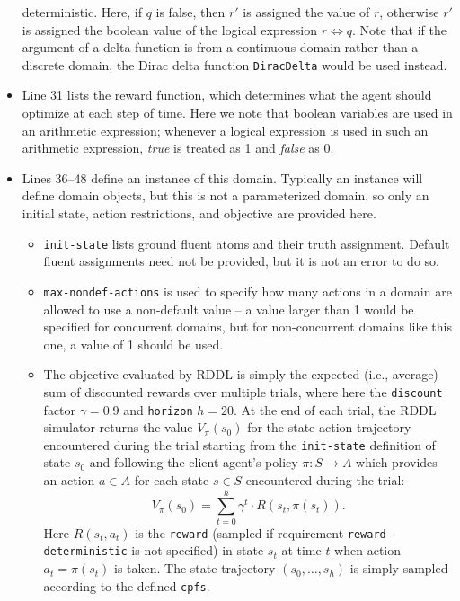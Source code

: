 \documentclass[11pt,a4paper]{article}
\begin{document}
\begin{itemize}
deterministic.  Here, if $q$ is false, then $r'$ is assigned the value
of $r$, otherwise $r'$ is assigned the boolean value of the logical
expression $r \Leftrightarrow q$.  Note that if the argument of a
delta function is from a continuous domain rather than a discrete
domain, the Dirac delta function \texttt{DiracDelta} would be used
instead.
\item Line 31 lists the reward function, which determines what the
agent should optimize at each step of time.  Here we note that boolean
variables are used in an arithmetic expression; whenever a logical
expression is used in such an arithmetic expression, {\it true} is treated
as 1 and {\it false} as 0.
\item Lines 36--48 define an instance of this domain.  Typically an
instance will define domain objects, but this is not a parameterized
domain, so only an initial state, action restrictions, and objective
are provided here.
\begin{itemize}
\item \texttt{init-state} lists ground fluent atoms and their truth
assignment.  Default fluent assignments need not be provided, but it is
not an error to do so. 
\item \texttt{max-nondef-actions} is used to specify how
many actions in a domain are allowed to use a non-default value -- a
value larger than 1 would be specified for concurrent domains, but for
non-concurrent domains like this one, a value of 1 should be used.
\item The objective evaluated by RDDL is simply the expected (i.e.,
average) sum of discounted rewards over multiple trials, where here
the \texttt{discount} factor $\gamma = 0.9$ and \texttt{horizon}
$h=20$.  At the end of each trial, the RDDL simulator returns the
value $V_{\pi}(s_0)$ for the state-action trajectory encountered
during the trial starting from the \texttt{init-state} definition of
state $s_0$ and following the client agent's policy $\pi: S
\rightarrow A$ which provides an action $a \in A$ for each state $s
\in S$ encountered during the trial:
\begin{equation}
V_{\pi}(s_0) = \sum_{t=0}^{h} \gamma^t \cdot R(s_t,\pi(s_t)).
\end{equation}
Here $R(s_t,a_t)$ is the \texttt{reward} (sampled if requirement 
\texttt{reward-deterministic} is not specified)
in state $s_t$ at time $t$ when action $a_t = \pi(s_t)$ is taken.
The state trajectory $(s_0,\ldots,s_h)$ 
is simply sampled according to the defined
\texttt{cpfs}.
\end{itemize}
\end{itemize}
\end{document}
